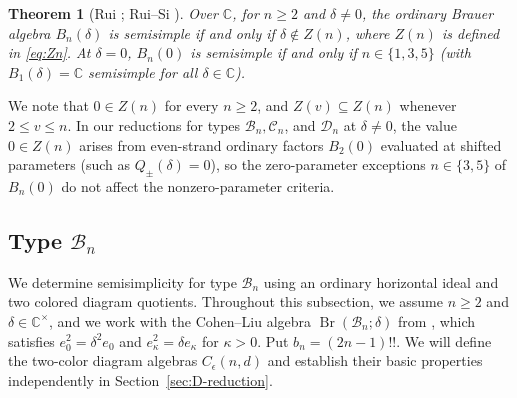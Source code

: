 \documentclass[11pt,a4paper]{amsart}
\newtheorem{theorem}{Theorem}[section]
\theoremstyle{uprightdefinition}
\theoremstyle{remark}\newtheorem{remark}[theorem]{Remark}
\begin{document}
\begin{theorem}[{Rui \cite{Rui2005}; Rui--Si \cite[Theorem~2.3 and Lemma~2.4]{RuiSi2006}}]
\label{thm:typeA-rui-si}
Over $\mathbb C$, for $n\ge2$ and $\delta\ne0$, the ordinary Brauer algebra
$B_n(\delta)$ is semisimple if and only if $\delta\notin Z(n)$, where $Z(n)$ is
defined in \eqref{eq:Zn}.  At $\delta=0$, $B_n(0)$ is semisimple if and only if
$n\in\{1,3,5\}$ (with $B_1(\delta)=\mathbb C$ semisimple for all $\delta\in\mathbb C$).
\end{theorem}

We note that $0\in Z(n)$ for every $n\ge2$, and $Z(v)\subseteq Z(n)$ whenever
$2\le v\le n$. In our reductions for types $\mathscr{B}_n, \mathscr{C}_n$, and $\mathscr{D}_n$ at $\delta\ne0$,
the value $0\in Z(n)$ arises from even-strand ordinary factors
$B_2(0)$ evaluated at shifted parameters (such as $Q_\pm(\delta)=0$), so the zero-parameter exceptions $n\in\{3,5\}$ of $B_n(0)$ do not affect the nonzero-parameter criteria.


\subsection{Type \texorpdfstring{$\mathscr{B}_n$}{Bn}}
\label{subsec:type-B}
\label{subsec:Bn-reduction}
We determine semisimplicity for type $\mathscr{B}_n$ using an ordinary horizontal
ideal and two colored diagram quotients. Throughout this subsection, we assume $n\geq2$ and $\delta\in\mathbb C^\times$,
and we work with the Cohen--Liu algebra $\operatorname{Br}(\mathscr{B}_n;\delta)$ from \cite[Definition~2.1]{CohenLiu2014},
which satisfies $e_0^2=\delta^2e_0$ and $e_{\kappa}^2=\delta e_{\kappa}$ for $\kappa>0$.
Put $b_n=(2n-1)!!$. We will define the two-color diagram algebras
$C_\epsilon(n,d)$ and establish their basic properties independently in
Section~\ref{sec:D-reduction}.
\end{document}
